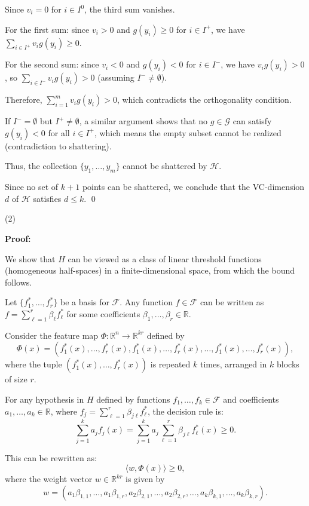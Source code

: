 \documentclass[letterpaper, 11pt]{article}
\newcommand{\1}{\mathds{1}}	%
\theoremstyle{definition}
\begin{document}
Since $v_i = 0$ for $i \in I^0$, the third sum vanishes.

For the first sum: since $v_i > 0$ and $g(y_i) \geq 0$ for $i \in I^+$, we have $\sum_{i \in I^+} v_i g(y_i) \geq 0$.

For the second sum: since $v_i < 0$ and $g(y_i) < 0$ for $i \in I^-$, we have $v_i g(y_i) > 0$, so $\sum_{i \in I^-} v_i g(y_i) > 0$ (assuming $I^- \neq \emptyset$).

Therefore, $\sum_{i=1}^m v_i g(y_i) > 0$, which contradicts the orthogonality condition.

If $I^- = \emptyset$ but $I^+ \neq \emptyset$, a similar argument shows that no $g \in \mathcal{G}$ can satisfy $g(y_i) < 0$ for all $i \in I^+$, which means the empty subset cannot be realized (contradiction to shattering).

Thus, the collection $\{y_1, \ldots, y_m\}$ cannot be shattered by $\mathcal{H}$.

Since no set of $k + 1$ points can be shattered, we conclude that the VC-dimension $d$ of $\mathcal{H}$ satisfies $d \leq k$. \qed


(2)

\textbf{Proof:}

We show that $H$ can be viewed as a class of linear threshold functions (homogeneous half-spaces) in a finite-dimensional space, from which the bound follows.

Let $\{f_1^*, \ldots, f_r^*\}$ be a basis for $\mathcal{F}$. Any function $f \in \mathcal{F}$ can be written as $f = \sum_{\ell=1}^r \beta_\ell f_\ell^*$ for some coefficients $\beta_1, \ldots, \beta_r \in \mathbb{R}$.

Consider the feature map $\Phi: \mathbb{R}^n \to \mathbb{R}^{kr}$ defined by
\[
\Phi(x) = (f_1^*(x), \ldots, f_r^*(x), f_1^*(x), \ldots, f_r^*(x), \ldots, f_1^*(x), \ldots, f_r^*(x)),
\]
where the tuple $(f_1^*(x), \ldots, f_r^*(x))$ is repeated $k$ times, arranged in $k$ blocks of size $r$.

For any hypothesis in $H$ defined by functions $f_1, \ldots, f_k \in \mathcal{F}$ and coefficients $a_1, \ldots, a_k \in \mathbb{R}$, where $f_j = \sum_{\ell=1}^r \beta_{j\ell} f_\ell^*$, the decision rule is:
\[
\sum_{j=1}^k a_j f_j(x) = \sum_{j=1}^k a_j \sum_{\ell=1}^r \beta_{j\ell} f_\ell^*(x) \geq 0.
\]

This can be rewritten as:
\[
\langle w, \Phi(x) \rangle \geq 0,
\]
where the weight vector $w \in \mathbb{R}^{kr}$ is given by
\[
w = (a_1\beta_{1,1}, \ldots, a_1\beta_{1,r}, a_2\beta_{2,1}, \ldots, a_2\beta_{2,r}, \ldots, a_k\beta_{k,1}, \ldots, a_k\beta_{k,r}).
\]
\end{document}
